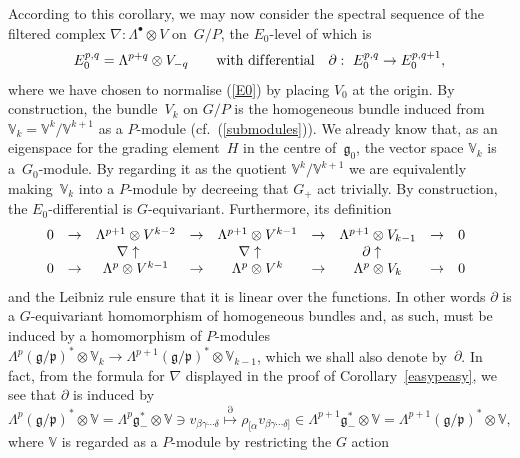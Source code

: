According to this corollary, we may now consider the spectral sequence of the
f\/iltered complex $\nabla:\Lambda^\bullet\otimes V$ on~$G/P$, the $E_0$-level
of which is
\begin{equation}\label{E0pq}
E_0^{p,q}=\Lambda^{p+q}\otimes V_{-q}\qquad\mbox{with dif\/ferential}\quad
\partial: \ E_0^{p,q}\to E_0^{p,q+1},\end{equation}
where we have chosen to normalise (\ref{E0}) by placing $V_0$ at the origin. By
construction, the bundle~$V_k$ on $G/P$ is the homogeneous bundle induced from
${\mathbb{V}}_k={\mathbb{V}}^k/{\mathbb{V}}^{k+1}$ as a $P$-module
(cf.~(\ref{submodules})). We already know that, as an eigenspace for the
grading element~$H$ in the centre of~${\mathfrak{g}}_0$, the vector space
${\mathbb{V}}_k$ is a~$G_0$-module. By regarding it as the quotient
${\mathbb{V}}^k/{\mathbb{V}}^{k+1}$ we are equivalently making~${\mathbb{V}}_k$
into a $P$-module by decreeing that $G_+$ act trivially. By construction, the
$E_0$-dif\/ferential is $G$-equivariant. Furthermore, its def\/inition
\[\begin{array}{@{}ccccccccc}
0&\to&\Lambda^{p+1}\otimes V^{k-2}&\to&\Lambda^{p+1}\otimes V^{k-1}&\to&
\Lambda^{p+1}\otimes V_{k-1}&\to&0\\
&&\nabla\uparrow\phantom{\nabla}&&\nabla\uparrow\phantom{\nabla}&&
\partial\uparrow\phantom{\partial}\\
0&\to&\Lambda^p\otimes V^{k-1}&\to&\Lambda^p\otimes V^k&\to&
\Lambda^p\otimes V_k&\to&0
\end{array}\]
and the Leibniz rule ensure that it is linear over the functions. In other
words $\partial$ is a $G$-equivariant homomorphism of homogeneous bundles and,
as such, must be induced by a homomorphism of $P$-modules
$\Lambda^p({\mathfrak{g}}/{\mathfrak{p}})^*\otimes{\mathbb{V}}_k\to
\Lambda^{p+1}({\mathfrak{g}}/{\mathfrak{p}})^*\otimes{\mathbb{V}}_{k-1}$, which
we shall also denote by~$\partial$. In fact, from the formula for $\nabla$
displayed in the proof of Corollary~\ref{easypeasy}, we see that $\partial$ is
induced by
\begin{equation}\label{E0differential}
\Lambda^p({\mathfrak{g}}/{\mathfrak{p}})^*\otimes{\mathbb{V}}=
\Lambda^p{\mathfrak{g}}_-^*\otimes{\mathbb{V}}
\ni v_{\beta\gamma\cdots\delta}\stackrel{\partial}{\longmapsto}
\rho_{[\alpha}v_{\beta\gamma\cdots\delta]}\in
\Lambda^{p+1}{\mathfrak{g}}_-^*\otimes{\mathbb{V}}=
\Lambda^{p+1}({\mathfrak{g}}/{\mathfrak{p}})^*\otimes{\mathbb{V}},
\end{equation}
where ${\mathbb{V}}$ is regarded as a $P$-module by restricting the $G$ action
